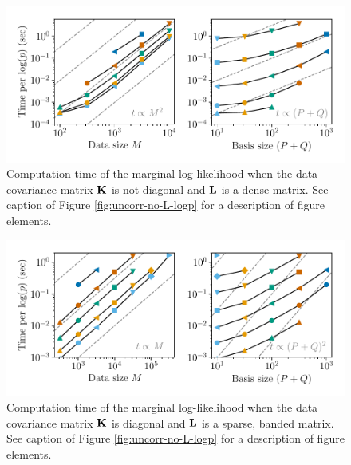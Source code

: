 \documentclass[manuscript]{aastex62}
\newcommand{\vx}[1]{{\bf {#1}}}
\begin{document}
\begin{figure}
  \includegraphics{corr_yes_L_scaling.pdf}
  \caption{Computation time of the marginal log-likelihood when the data covariance matrix $\vx{K}$ is not diagonal and $\vx{L}$ is a dense matrix. See caption of Figure \ref{fig:uncorr-no-L-logp} for a description of figure elements.}
  \label{fig:corr-yes-L-logp}
\end{figure}

\begin{figure}
  \includegraphics{uncorr_sparse_L_scaling.pdf}
  \caption{Computation time of the marginal log-likelihood when the data covariance matrix $\vx{K}$ is diagonal and $\vx{L}$ is a sparse, banded matrix. See caption of Figure \ref{fig:uncorr-no-L-logp} for a description of figure elements.}
  \label{fig:uncorr-sparse-L-logp}
\end{figure}
\end{document}
